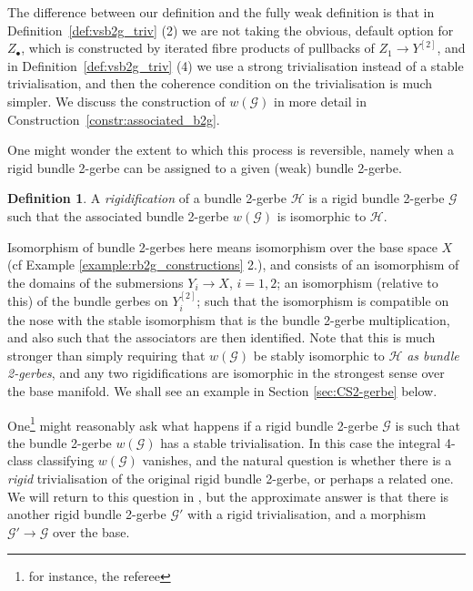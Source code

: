 \documentclass[12pt]{amsart}
\theoremstyle{plain}
\theoremstyle{definition}
\newtheorem{definition}[theorem]{Definition}
\theoremstyle{remark}
\numberwithin{equation}{section}
\newcommand{\cH}{{\mathcal H}}
\newcommand{\cG}{\mathcal{G}}
\newcommand{\<}{\langle}
\renewcommand{\>}{\rangle}
\begin{document}
The difference between our definition and the fully weak definition is that in Definition~\ref{def:vsb2g_triv} (2) we are not taking the obvious, default option for $Z_\bullet$, which is constructed by iterated fibre products of pullbacks of $Z_1\to Y^{[2]}$, and in Definition~\ref{def:vsb2g_triv} (4) we use a strong trivialisation instead of a stable trivialisation, and then the coherence condition on the trivialisation is much simpler.
We discuss the construction of $w(\cG)$ in more detail in Construction~\ref{constr:associated_b2g}. 


One might wonder the extent to which this process is reversible, namely when a rigid bundle 2-gerbe can be assigned to a given (weak) bundle 2-gerbe.


\begin{definition}\label{def:rigidification}
A \emph{rigidification} of a bundle 2-gerbe $\mathcal{H}$ is a rigid bundle 2-gerbe $\cG$ such that the associated bundle 2-gerbe $w(\cG)$ is isomorphic to $\mathcal{H}$. 
\end{definition}

Isomorphism of bundle 2-gerbes here means isomorphism over the base space $X$ (cf Example \ref{example:rb2g_constructions} 2.), and consists of an isomorphism of the domains of the submersions $Y_i\to X$, $i=1,2$; an isomorphism (relative to this) of the bundle gerbes on $Y_i^{[2]}$; such that the isomorphism is compatible on the nose with the stable isomorphism that is the bundle 2-gerbe multiplication, and also such that the associators are then identified. 
Note that this is much stronger than simply requiring that $w(\cG)$ be stably isomorphic to $\cH$ \emph{as bundle 2-gerbes}, and any two rigidifications are isomorphic in the strongest sense over the base manifold.
We shall see an example in Section \ref{sec:CS2-gerbe} below.

One\footnote{for instance, the referee} might reasonably ask what happens if a rigid bundle 2-gerbe $\mathcal{G}$ is such that the bundle 2-gerbe $w(\mathcal{G})$ has a stable trivialisation. 
In this case the integral 4-class classifying $w(\mathcal{G})$ vanishes, and the natural question is whether there is a \emph{rigid} trivialisation of the original rigid bundle 2-gerbe, or perhaps a related one.
We will return to this question in \cite{rb2g_II}, but the approximate answer is that there is another rigid bundle 2-gerbe $\mathcal{G}'$ with a rigid trivialisation, and a morphism $\mathcal{G}'\to \mathcal{G}$ over the base.
\end{document}

